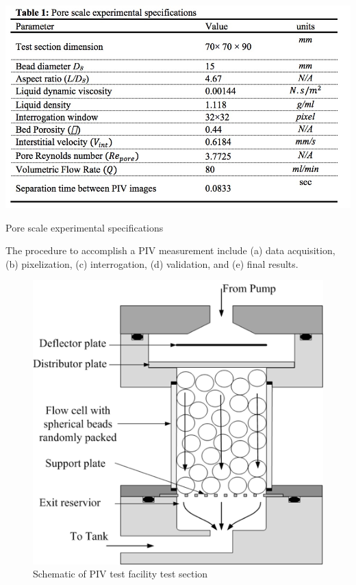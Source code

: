 \documentclass[letterpaper,12pt,titlepage,fleqn]{article}
\begin{document}
\begin{CJK}{UTF8}{gkai}
\begin{table}[!h]
	\centering
	\includegraphics[width=\linewidth]{Pore.jpg}
	\caption{Pore scale experimental specifications}
\end{table}

The procedure to accomplish a PIV measurement include (a) data acquisition, (b) pixelization, (c) interrogation, (d) validation, and (e) final results.



\begin{figure}[!h]
	\centering
	\includegraphics[width= 0.5\linewidth ]{pump.png}
	\caption{Schematic of PIV test facility test section}
	

\end{figure}
\end{CJK}
\end{document}
